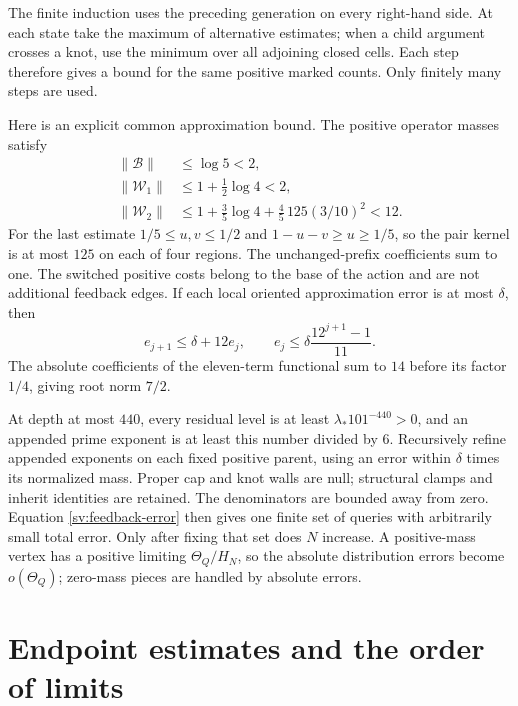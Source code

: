 The finite induction uses the preceding generation on every
right-hand side. At each state take the maximum of alternative
estimates; when a child argument crosses a knot, use the minimum
over all adjoining closed cells. Each step therefore gives a bound
for the same positive marked counts. Only finitely many steps
are used.

Here is an explicit common approximation bound.  The positive operator
masses satisfy
\begin{align*}
 \|\mathcal B\|&\le\log5<2,\\
 \|\mathcal W_1\|&\le1+\tfrac12\log4<2,\\
 \|\mathcal W_2\|&\le1+\tfrac35\log4
                 +\tfrac45\,125(3/10)^2<12.
\end{align*}
For the last estimate $1/5\le u,v\le1/2$ and
$1-u-v\ge u\ge1/5$, so the pair kernel is at most $125$ on
each of four regions.  The unchanged-prefix coefficients sum to one.
The switched positive costs belong to the base of the action and
are not additional feedback edges.
If each local oriented approximation error is at most $\delta$,
then
\begin{equation}\label{sv:feedback-error}
 e_{j+1}\le\delta+12e_j,\qquad
 e_j\le\delta\frac{12^{j+1}-1}{11}.
\end{equation}
The absolute coefficients of the eleven-term functional sum to $14$
before its factor $1/4$, giving root norm $7/2$.

At depth at most $440$, every residual level is at least
$\lambda_*101^{-440}>0$, and an appended prime exponent is at
least this number divided by $6$.  Recursively refine appended
exponents on each fixed positive parent, using an error within
$\delta$ times its normalized mass.  Proper cap and knot walls are
null; structural clamps and inherit identities are retained.
The denominators are bounded away from zero.  Equation
\eqref{sv:feedback-error} then gives one finite set of queries with
arbitrarily small total error.  Only after fixing that set does $N$
increase.  A positive-mass vertex has a positive limiting
$\Theta_Q/H_N$, so the absolute distribution errors become
$o(\Theta_Q)$; zero-mass pieces are handled by absolute errors.

\section{Endpoint estimates and the order of limits}\label{app:cross-review}

